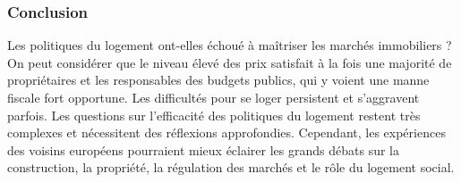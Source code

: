 \documentclass[a4paper, 12pt]{report}
\begin{document}
\subsubsection{Conclusion}

Les politiques du logement ont-elles échoué à maîtriser les marchés immobiliers ? On peut considérer que le niveau élevé des prix satisfait à la fois une majorité de propriétaires et les responsables des budgets publics, qui y voient une manne fiscale fort opportune. Les difficultés pour se loger persistent et s'aggravent parfois. Les questions sur l’efficacité des politiques du logement restent très complexes et nécessitent des réflexions approfondies. Cependant, les expériences des voisins européens pourraient mieux éclairer les grands débats sur la construction, la propriété, la régulation des marchés et le rôle du logement social.
\end{document}
